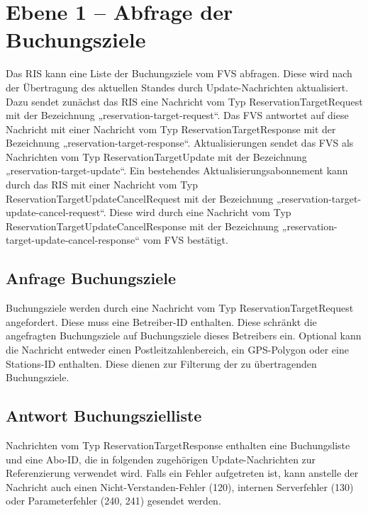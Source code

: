 \section{Ebene 1 -- Abfrage der Buchungsziele}
Das RIS kann eine Liste der Buchungsziele vom FVS abfragen. Diese wird nach der Übertragung des aktuellen Standes durch Update-Nachrichten aktualisiert. Dazu sendet zunächst das RIS eine Nachricht vom Typ ReservationTargetRequest mit der Bezeichnung „reservation-target-request“. Das FVS antwortet auf diese Nachricht mit einer Nachricht vom Typ ReservationTargetResponse mit der Bezeichnung „reservation-target-response“. Aktualisierungen sendet das FVS als Nachrichten vom Typ ReservationTargetUpdate mit der Bezeichnung „reservation-target-update“. Ein bestehendes Aktualisierungsabonnement kann durch das RIS mit einer Nachricht vom Typ ReservationTargetUpdateCancelRequest mit der Bezeichnung „reservation-target-update-cancel-request“. Diese wird durch eine Nachricht vom Typ ReservationTargetUpdateCancelResponse mit der Bezeichnung „reservation-target-update-cancel-response“ vom FVS bestätigt.



\subsection{Anfrage Buchungsziele}
Buchungsziele werden durch eine Nachricht vom Typ ReservationTargetRequest angefordert. Diese muss eine Betreiber-ID enthalten. Diese schränkt die angefragten Buchungsziele auf Buchungsziele dieses Betreibers ein. Optional kann die Nachricht entweder einen Postleitzahlenbereich, ein GPS-Polygon oder eine Stations-ID enthalten. Diese dienen zur Filterung der zu übertragenden Buchungsziele.



\subsection{Antwort Buchungszielliste}
Nachrichten vom Typ ReservationTargetResponse enthalten eine Buchungsliste und eine Abo-ID, die in folgenden zugehörigen Update-Nachrichten zur Referenzierung verwendet wird. Falls ein Fehler aufgetreten ist, kann anstelle der Nachricht auch einen Nicht-Verstanden-Fehler (120), internen Serverfehler (130) oder Parameterfehler (240, 241) gesendet werden.



